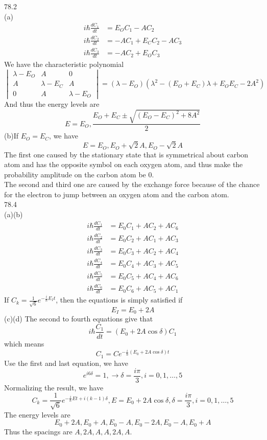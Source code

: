 \documentclass[utf8]{ctexart}
\begin{document}
78.2\\
(a)\begin{align*}
	i\hbar\frac{dC_1}{dt}&=E_OC_1-AC_2\\
	i\hbar\frac{dC_2}{dt}&=-AC_1+E_CC_2-AC_3\\
	i\hbar\frac{dC_3}{dt}&=-AC_2+E_OC_3
\end{align*}
We have the characteristic polynomial
\[\begin{vmatrix}
	\lambda-E_O&A&0\\
	A&\lambda-E_C&A\\
	0&A&\lambda-E_O
\end{vmatrix}=(\lambda-E_O)(\lambda^2-(E_O+E_C)\lambda+E_OE_C-2A^2)\]
And thus the energy levels are
\[E=E_O,\frac{E_O+E_C\pm\sqrt{(E_O-E_C)^2+8A^2}}{2}\]
(b)If $E_O=E_C$, we have
\[E=E_O,E_O+\sqrt{2}A,E_O-\sqrt{2}A\]
\indent The first one caused by the stationary state that is symmetrical about carbon atom and has the opposite symbol on each oxygen atom, and thus make the probability amplitude on the carbon atom be $0$.\\
\indent The second and third one are caused by the exchange force because of the chance for the electron to jump between an oxygen atom and the carbon atom.\\
78.4\\
(a)(b)\begin{align*}
	i\hbar\frac{dC_1}{dt}&=E_0C_1+AC_2+AC_6\\
	i\hbar\frac{dC_2}{dt}&=E_0C_2+AC_1+AC_3\\
	i\hbar\frac{dC_3}{dt}&=E_0C_3+AC_2+AC_4\\
	i\hbar\frac{dC_4}{dt}&=E_0C_4+AC_3+AC_5\\
	i\hbar\frac{dC_5}{dt}&=E_0C_5+AC_4+AC_6\\
	i\hbar\frac{dC_6}{dt}&=E_0C_6+AC_5+AC_1
\end{align*}
If $C_k=\frac{1}{\sqrt{6}}e^{-\frac{i}{\hbar}E_It}$, then the equations is simply satisfied if 
\[E_I=E_0+2A\]
(c)(d)
The second to fourth equations give that
\[i\hbar\frac{C_1}{dt}=(E_0+2A\cos\delta)C_1\]
which means
\[C_1=Ce^{-\frac{i}{\hbar}(E_0+2A\cos\delta)t}\]
Use the first and last equation, we have
\[e^{i6\delta}=1,\rightarrow\delta=\frac{i\pi}{3},i=0,1,\dots,5\]
Normalizing the result, we have
\[C_k=\frac{1}{\sqrt{6}}e^{-\frac{i}{\hbar}Et+i(k-1)\delta},E=E_0+2A\cos\delta,\delta=\frac{i\pi}{3},i=0,1,\dots,5\]
The energy levels are
\[E_0+2A,E_0+A,E_0-A,E_0-2A,E_0-A,E_0+A\]
Thus the spacings are $A,2A,A,A,2A,A$.
\end{document}
